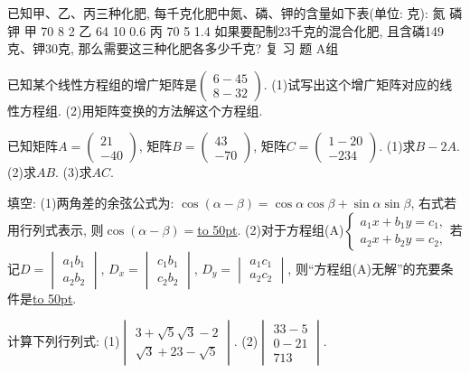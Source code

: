 \documentclass[10pt,a4paper]{article}
\newcommand{\blank}[1]{\underline{\hbox to #1pt{}}}
\begin{document}
\begin{enumerate}[1.]
{\item 已知甲、乙、丙三种化肥, 每千克化肥中氮、磷、钾的含量如下表(单位: 克):
氮	磷	钾
甲	70	8	2
乙	64	10	0.6
丙	70	5	1.4
如果要配制23千克的混合化肥, 且含磷149克、钾30克, 那么需要这三种化肥各多少千克?
复 习 题
A组
\item 已知某个线性方程组的增广矩阵是$\begin{pmatrix}
    6  -4  5  \\8  -3  2  \end{pmatrix}$.
(1)试写出这个增广矩阵对应的线性方程组.
(2)用矩阵变换的方法解这个方程组.
\item 已知矩阵$A=\begin{pmatrix}
    2  1  \\-4  0  \end{pmatrix}$, 矩阵$B=\begin{pmatrix}
    4  3  \\-7  0  \end{pmatrix}$, 矩阵$C=\begin{pmatrix}
    1  -2  0  \\-2  3  4  \end{pmatrix}$.
(1)求$B-2A$.							(2)求$AB$.
(3)求$AC$.
\item 填空:
(1)两角差的余弦公式为: $\cos (\alpha -\beta)=\cos \alpha \cos \beta +\sin \alpha \sin \beta$, 右式若用行列式表示, 则$\cos (\alpha -\beta)=$\blank{50}.
(2)对于方程组(A)$\begin{cases}
    a_1x+b_1y=c_1,  \\a_2x+b_2y=c_2,  \end{cases}$若记$D=\begin{vmatrix}
    a_1  b_1  \\a_2  b_2  \end{vmatrix}$, $D_x=\begin{vmatrix}
    c_1  b_1  \\c_2  b_2  \end{vmatrix}$, $D_y=\begin{vmatrix}
    a_1  c_1  \\a_2  c_2  \end{vmatrix}$, 则``方程组(A)无解''的充要条件是\blank{50}.
\item 计算下列行列式:
(1)$\begin{vmatrix}
    3+\sqrt 5  \sqrt 3-2  \\\sqrt 3+2  3-\sqrt 5  \end{vmatrix}$.					(2)$\begin{vmatrix}
    3  3  -5  \\0  -2  1  \\7  1  3  \end{vmatrix}$.
}
\end{enumerate}
\end{document}
